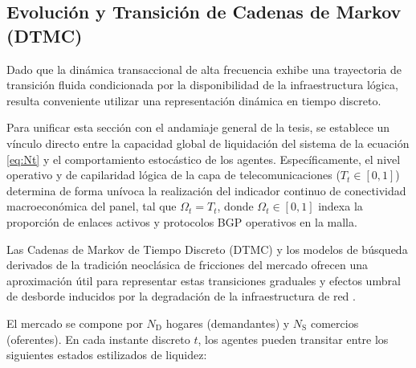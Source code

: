 \subsection{Evoluci\'on y Transici\'on de Cadenas de Markov (DTMC)}
\label{sec:B_2}

Dado que la din\'amica transaccional de alta frecuencia exhibe una trayectoria de transici\'on fluida condicionada por la disponibilidad de la infraestructura l\'ogica, resulta conveniente utilizar una representaci\'on din\'amica en tiempo discreto. 

Para unificar esta secci\'on con el andamiaje general de la tesis, se establece un v\'inculo directo entre la capacidad global de liquidaci\'on del sistema de la ecuaci\'on \ref{eq:Nt} y el comportamiento estoc\'astico de los agentes. Espec\'ificamente, el nivel operativo y de capilaridad l\'ogica de la capa de telecomunicaciones ($T_t \in [0,1]$) determina de forma un\'ivoca la realizaci\'on del indicador continuo de conectividad macroecon\'omica del panel, tal que $\Omega_t = T_t$, donde $\Omega_t \in [0,1]$ indexa la proporci\'on de enlaces activos y protocolos BGP operativos en la malla. 

Las Cadenas de Markov de Tiempo Discreto (DTMC) y los modelos de b\'usqueda derivados de la tradici\'on neocl\'asica de fricciones del mercado ofrecen una aproximaci\'on \'util para representar estas transiciones graduales y efectos umbral de desborde inducidos por la degradaci\'on de la infraestructura de red \citep{acemoglu2012network, sargent2022economic}.

El mercado se compone por $N_{\text{D}}$ hogares (demandantes) y $N_{\text{S}}$ comercios (oferentes). En cada instante discreto $t$, los agentes pueden transitar entre los siguientes estados estilizados de liquidez:

